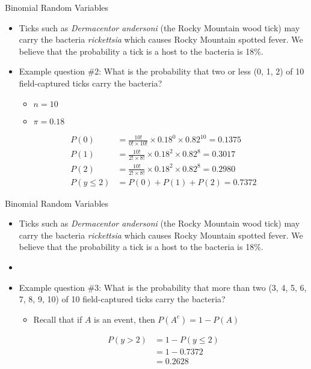 \documentclass[xcolor=dvipsnames]{beamer}
\begin{document}
\begin{frame}{Binomial Random Variables}
	\begin{itemize}
		\item Ticks such as \emph{Dermacentor andersoni} (the Rocky Mountain wood tick) may carry the bacteria \emph{rickettsia} which causes Rocky Mountain spotted fever. We believe that the probability a tick is a host to the bacteria is 18\%. 
		\item Example question \#2: What is the probability that two or less (0, 1, 2) of 10 field-captured ticks carry the bacteria?
		\begin{itemize}
			\item $n = 10$
			\item $\pi = 0.18$
		\end{itemize}
		\begin{align*}
		P(0) &= \frac{10!}{0! \times 10!} \times 0.18^{0} \times 0.82^{10} = 0.1375 \\
		P(1) &= \frac{10!}{2! \times 8!} \times 0.18^{2} \times 0.82^{8} = 0.3017 \\
		P(2) &= \frac{10!}{2! \times 8!} \times 0.18^{2} \times 0.82^{8} = 0.2980\\
		P(y \leq 2) &= P(0) + P(1) + P(2) = 0.7372
		\end{align*}
	\end{itemize}
\end{frame}

\begin{frame}{Binomial Random Variables}
	\begin{itemize}
		\item Ticks such as \emph{Dermacentor andersoni} (the Rocky Mountain wood tick) may carry the bacteria \emph{rickettsia} which causes Rocky Mountain spotted fever. We believe that the probability a tick is a host to the bacteria is 18\%. 
		\item[]
		\item Example question \#3: What is the probability that more than two (3, 4, 5, 6, 7, 8, 9, 10) of 10 field-captured ticks carry the bacteria?
		\begin{itemize}
			\item Recall that if $A$ is an event, then $P(A^c) = 1- P(A)$
		\end{itemize}
		\begin{align*}
			P(y > 2) &= 1 - P(y\leq 2) \\
			&= 1 - 0.7372 \\
			&= 0.2628
		\end{align*}
	\end{itemize}
\end{frame}
\end{document}
